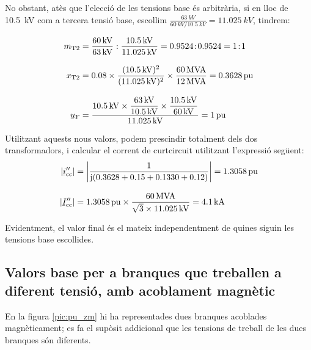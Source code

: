 \begin{exemple}
     No obstant, atès que l'elecció de les tensions base és
     arbitrària, si en lloc de \SI{10,5}{kV} com a tercera tensió base,
     escollim
     $\frac{\SI{63}{kV}}{\SI{60}{kV} / \SI{10,5}{kV}}=\SI{11,025}{kV}$,
     tindrem:

    \begin{align*}
       m\ped{T2} &= \frac{60\unit{kV}}{63\unit{kV}} : \frac{\SI{10,5}{kV}}{\SI{11,025}{kV}}
       = \num{0,9524}\!:\!\num{0,9524} = 1\!:\!1 \\[3mm]
       x\ped{T2} &= \num{0,08} \times \frac{(\SI{10,5}{kV})^2}{(\SI{11,025}{kV})^2 } \times
       \frac{60\unit{MVA}}{12\unit{MVA}}  = \SI{0,3628}{pu}\\[3mm]
       \cmplx{u}\ped{F} &= \frac{\SI{10,5}{kV} \times \dfrac{63\unit{kV}}{\SI{10,5}{kV}} \times
       \dfrac{\SI{10,5}{kV}}{60\unit{kV}}}{\SI{11,025}{kV}} = 1\unit{pu}
    \end{align*}

    Utilitzant aquests nous valors, podem prescindir totalment dels dos
    transformadors, i calcular el corrent de curtcircuit utilitzant
    l'expressió següent:
    \begin{align*}
    |\cmplx{i}''\ped{cc}| &= \left| \frac{1}{\ju ( \num{0,3628} + \num{0,15} +
    \num{0,1330} + \num{0,12} )} \right| = \SI{1,3058}{pu} \\[3mm]
    |\cmplx{I}''\ped{cc}| &=
    \SI{1,3058}{pu}\times\frac{60\unit{MVA}}{\sqrt{3}\times \SI{11,025}{kV}} =
    \SI{4,1}{kA}
    \end{align*}

    Evidentment, el valor final és el mateix independentment de quines
    siguin les tensions base escollides.
\end{exemple}

\subsection{Valors base per a branques que treballen a diferent tensió, amb acoblament magnètic}

En la figura \vref{pic:pu_zm} hi ha representades dues branques acoblades magnèticament; es fa el supòsit addicional que les tensions de treball de les dues branques són diferents.

\begin{center}
    
    \label{pic:pu_zm}
\end{center}

